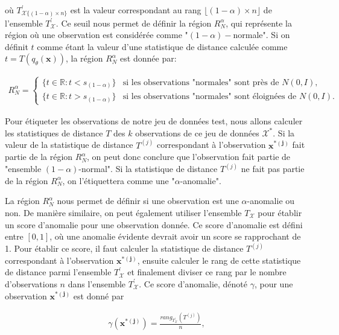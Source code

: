 où $T^{'}_{\mathcal{X} \{(1 - \alpha) \times n\}}$ est la valeur correspondant au rang $\lfloor(1 - \alpha) \times n\rfloor$ de l'ensemble $T^{'}_{\mathcal{X}}$. Ce seuil nous permet de définir la région $R_{N}^{\alpha}$, qui représente la région où une observation est considérée comme "$(1-\alpha)-$normale". Si on définit $t$ comme étant la valeur d'une statistique de distance calculée comme $t = T(q_\theta(\boldsymbol{x}))$, la région $R_{N}^{\alpha}$ est donnée par:

\begin{gather*} \label{eq:region}
	R_{N}^{\alpha} = 
	\begin{cases} 
		\big\{t \in \mathbb{R}: t < s_{(1 - \alpha)} \big\} & \text{si les observations "normales" sont près de $N(0, I)$}, \\
		\big\{t \in \mathbb{R}: t > s_{(1 - \alpha)} \big\} & \text{si les observations "normales" sont éloignées de $N(0, I)$}.
	\end{cases}
\end{gather*}

Pour étiqueter les observations de notre jeu de données test, nous allons calculer les statistiques de distance $T$ des $k$ observations de ce jeu de données $\mathcal{X^*}$. Si la valeur de la statistique de distance $T^{(j)}$ correspondant à l'observation $\boldsymbol{x^{*(j)}}$ fait partie de la région $R_{N}^{\alpha}$, on peut donc conclure que l'observation fait partie de "\DIFdelbegin {}\DIFdelend ensemble $(1-\alpha)$-normal". Si la statistique de distance $T^{(j)}$ ne fait pas partie de la région $R_{N}^{\alpha}$, on l'étiquettera comme une "$\alpha$-anomalie".

La région $R_{N}^{\alpha}$ nous permet de définir si une observation est une $\alpha$-anomalie ou non. De manière similaire, on peut également utiliser l'ensemble $T_{\mathcal{X}}$ pour établir un score d'anomalie pour une observation donnée. Ce score d'anomalie est défini entre $[0,1]$, où une anomalie évidente devrait avoir un score se rapprochant de 1. Pour établir ce score, il faut calculer la statistique de distance $T^{(j)}$ correspondant à l'observation $\boldsymbol{x^{*(j)}}$, ensuite calculer le rang de cette statistique de distance parmi l'ensemble $T^{'}_{\mathcal{X}}$ et finalement diviser ce rang par le nombre d'observations $n$ dans l'ensemble $T^{'}_{\mathcal{X}}$. Ce score d'anomalie, dénoté $\gamma$, pour une observation $\boldsymbol{x^{*(j)}}$ est donné par

\begin{gather} \label{eq:score_anomalie}
	\gamma(\boldsymbol{x^{*(j)}}) = \frac{rang_{T^{'}_{\mathcal{X}}}(T^{(j)})}{n},
\end{gather}

